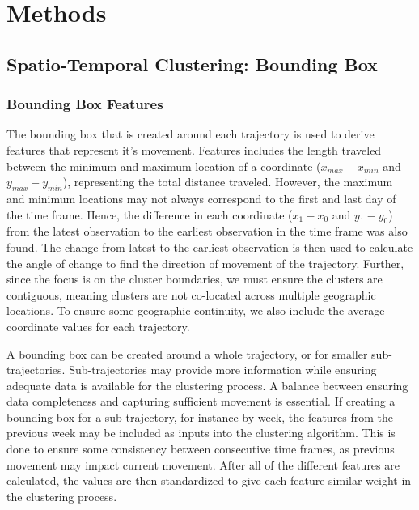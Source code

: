 \documentclass[12pt]{article}
\begin{document}
\hypertarget{methods}{%
\section{Methods}\label{methods}}

\hypertarget{spatio-temporal-clustering-bounding-box}{%
\subsection{Spatio-Temporal Clustering: Bounding
Box}\label{spatio-temporal-clustering-bounding-box}}

\hypertarget{bounding-box-features}{%
\subsubsection{Bounding Box Features}\label{bounding-box-features}}

The bounding box that is created around each trajectory is used to
derive features that represent it's movement. Features includes the
length traveled between the minimum and maximum location of a coordinate
(\(x_{max} - x_{min}\) and \(y_{max} - y_{min}\)), representing the
total distance traveled. However, the maximum and minimum locations may
not always correspond to the first and last day of the time frame.
Hence, the difference in each coordinate (\(x_{1} - x_{0}\) and
\(y_{1} - y_{0}\)) from the latest observation to the earliest
observation in the time frame was also found. The change from latest to
the earliest observation is then used to calculate the angle of change
to find the direction of movement of the trajectory. Further, since the
focus is on the cluster boundaries, we must ensure the clusters are
contiguous, meaning clusters are not co-located across multiple
geographic locations. To ensure some geographic continuity, we also
include the average coordinate values for each trajectory.

A bounding box can be created around a whole trajectory, or for smaller
sub-trajectories. Sub-trajectories may provide more information while
ensuring adequate data is available for the clustering process. A
balance between ensuring data completeness and capturing sufficient
movement is essential. If creating a bounding box for a sub-trajectory,
for instance by week, the features from the previous week may be
included as inputs into the clustering algorithm. This is done to ensure
some consistency between consecutive time frames, as previous movement
may impact current movement. After all of the different features are
calculated, the values are then standardized to give each feature
similar weight in the clustering process.
\end{document}
